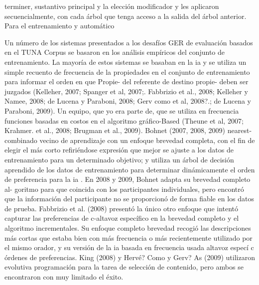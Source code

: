 terminer, sustantivo principal y la elecci\'on modificador y les aplicaron secuencialmente, con cada \'arbol que tenga acceso a la salida del \'arbol anterior. Para el entrenamiento y autom\'atico


Un n\'umero de los sistemas presentados a los desaf\'ios GER de evaluaci\'on basados
en el TUNA Corpus se basaron en los an\'alisis emp\'iricos del conjunto de entrenamiento. La mayor\'ia
de estos sistemas se basaban en la
ia y se utiliza un simple recuento de frecuencia de la
propiedades en el conjunto de entrenamiento para informar el orden en que Propie- del referente de destino
propie- deben ser juzgados (Kelleher, 2007; Spanger et al, 2007;. Fabbrizio et al., 2008;
Kelleher y Namee, 2008; de Lucena y Paraboni, 2008; Gerv como et al, 2008?.;
de Lucena y Paraboni, 2009). Un equipo, que yo era parte de, que se utiliza en frecuencia
funciones basadas en costos en el algoritmo gr\'afico-Based (Theune et al, 2007; Krahmer.
et al., 2008; Brugman et al., 2009). Bohnet (2007, 2008, 2009) nearest- combinado
vecino de aprendizaje con un enfoque brevedad completa, con el fin de elegir el m\'as corto
refiri\'endose expresi\'on que mejor se ajuste a los datos de entrenamiento para un determinado objetivo; y
utiliza un \'arbol de decisi\'on aprendido de los datos de entrenamiento para determinar din\'amicamente el
orden de preferencia para la
ia
. En 2008 y 2009, Bohnet adapta su brevedad completo al-
goritmo para que coincida con los participantes individuales, pero encontr\'o que la informaci\'on del participante
no se proporcion\'o de forma fiable en los datos de prueba. Fabbrizio et al. (2008) present\'o la
\'unico otro enfoque que intent\'o capturar las preferencias de c-altavoz espec\'ifico en
la brevedad completo y el algoritmo incrementales. Su enfoque completo brevedad recogi\'o
las descripciones m\'as cortas que estaba bien con m\'as frecuencia o m\'as recientemente utilizado por el
mismo orador, y su versi\'on de la
ia
basada en frecuencia usada altavoz espec\'i c
\'ordenes de preferencias. King (2008) y Herv\'e? Como y Gerv? As (2009) utilizaron evolutiva
programaci\'on para la tarea de selecci\'on de contenido, pero ambos se encontraron con muy limitado
el \'exito.

